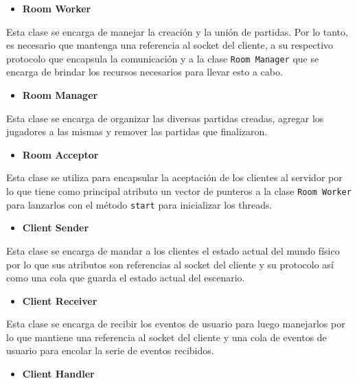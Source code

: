 \documentclass[a4paper]{article}
\begin{document}
\begin{itemize}
	\item \textbf{Room Worker}
\end{itemize}

Esta clase se encarga de manejar la creación y la unión de partidas. Por lo tanto, es necesario que mantenga una referencia al socket del cliente, a su respectivo protocolo que encapsula la comunicación y a la clase \texttt{Room Manager} que se encarga de brindar los recursos necesarios para llevar esto a cabo.

\begin{itemize}
	\item \textbf{Room Manager}
\end{itemize}

Esta clase se encarga de organizar las diversas partidas creadas, agregar los jugadores a las mismas y remover las partidas que finalizaron.

\begin{itemize}
	\item \textbf{Room Acceptor}
\end{itemize}

Esta clase se utiliza para encapsular la aceptación de los clientes al servidor por lo que tiene como principal atributo un vector de punteros a la clase \texttt{Room Worker} para lanzarlos con el método \texttt{start} para inicializar los threads.

\begin{itemize}
	\item \textbf{Client Sender}
\end{itemize}

Esta clase se encarga de mandar a los clientes el estado actual del mundo físico por lo que sus atributos son referencias al socket del cliente y su protocolo así como una cola que guarda el estado actual del escenario.

\begin{itemize}
	\item \textbf{Client Receiver}
\end{itemize}

Esta clase se encarga de recibir los eventos de usuario para luego manejarlos por lo que mantiene una referencia al socket del cliente y una cola de eventos de usuario para encolar la serie de eventos recibidos.

\begin{itemize}
	\item \textbf{Client Handler}
\end{itemize}
\end{document}
